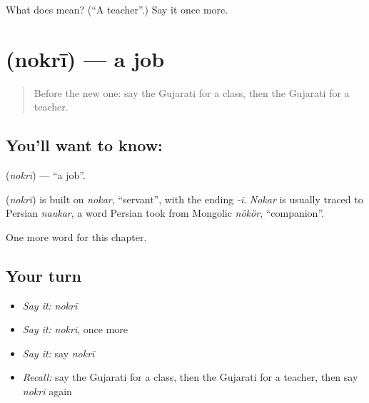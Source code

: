\begin{tcolorbox}[breakable,colback=teal!4,colframe=teal!35!black,title={Before you move on}]
What does  mean? (\textquotedblleft{}A teacher\textquotedblright{}.) Say it once more.
\end{tcolorbox}
\section[\texorpdfstring{\gu{નોકરી} (nokrī)}{નોકરી (nokrī)}]{ (nokrī) — a job}

\label{lesson:GU-C130-nokri}



\begin{quote}
Before the new one: say the Gujarati for a class, then the Gujarati for a teacher.
\end{quote}

\subsection*{You'll want to know: }
\textbf{} (\emph{nokrī}) — \textquotedblleft{}a job\textquotedblright{}.

\begin{cousinweb}
\textbf{} (\emph{nokrī}) is built on \emph{nokar}, \textquotedblleft{}servant\textquotedblright{}, with the ending \emph{-ī}. \emph{Nokar} is usually traced to Persian \emph{naukar}, a word Persian took from Mongolic \emph{nökör}, \textquotedblleft{}companion\textquotedblright{}.
\end{cousinweb}

\begin{grammarlens}[title={What you've built}]
One more word for this chapter.
\end{grammarlens}

\subsection*{Your turn}
\begin{itemize}
\raggedright
  \item \emph{Say it:} \emph{nokrī}
  \item \emph{Say it:} \emph{nokrī}, once more
  \item \emph{Say it:} say \emph{nokrī}
  \item \emph{Recall:} say the Gujarati for a class, then the Gujarati for a teacher, then say \emph{nokrī} again
\end{itemize}

